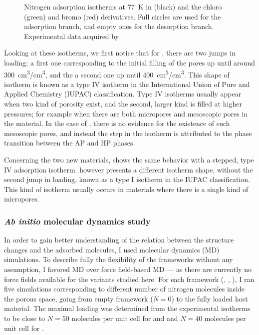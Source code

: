 \documentclass[thesis]{subfiles}
\begin{document}
\begin{figure}[ht]
    \centering
    
    \caption{Nitrogen adsorption isotherms at \SI{77}{K} in  (black) and
    the chloro (green) and bromo (red) derivatives. Full circles are used for
    the adsorption branch, and empty ones for the desorption branch.
    Experimental data acquired by\citeauthor{Chaplais2018}\cite{Chaplais2018}}
    \label{fig:zif8x:isotherms}
\end{figure}

Looking at these isotherms, we first notice that for , there are two jumps
in loading: a first one corresponding to the initial filling of the pores up
until around \SI{300}{cm^3/cm^3}, and the a second one up until
\SI{400}{cm^3/cm^3}. This shape of isotherm is known as a type IV isotherm in
the International Union of Pure and Applied Chemistry (IUPAC)
classification\cite{Sing1985}. Type IV isotherms usually appear when two kind of
porosity exist, and the second, larger kind is filled at higher pressures; for
example when there are both micropores and mesoscopic pores in the material. In
the case of , there is no evidence for the existence of such mesoscopic
pores, and instead the step in the isotherm is attributed to the phase
transition between the AP and HP phases.

Concerning the two new materials, \ZIFCl shows the same behavior with a stepped,
type IV adsorption isotherm. \ZIFBr however presents a different isotherm shape,
without the second jump in loading, known as a type I isotherm in the IUPAC
classification. This kind of isotherm usually occurs in materials where there is
a single kind of micropores.

\subsubsection{\emph{Ab initio} molecular dynamics study}
\label{sec:zif8x:methods}

In order to gain better understanding of the relation between the structure
changes and the adsorbed molecules, I used molecular dynamics (MD) simulations.
To describe fully the flexibility of the frameworks without any assumption, I
favored \abinitio MD over force field-based MD --- as there are currently no
force fields available for the  variants studied here. For each framework
(, \ZIFCl, \ZIFBr), I ran five simulations corresponding to different
number of nitrogen molecules inside the porous space, going from empty framework
($N = 0$) to the fully loaded host material. The maximal loading was determined
from the experimental isotherms to be close to $N = 50$ molecules per unit cell
for  and \ZIFCl and $N = 40$ molecules per unit cell for \ZIFBr.
\end{document}
